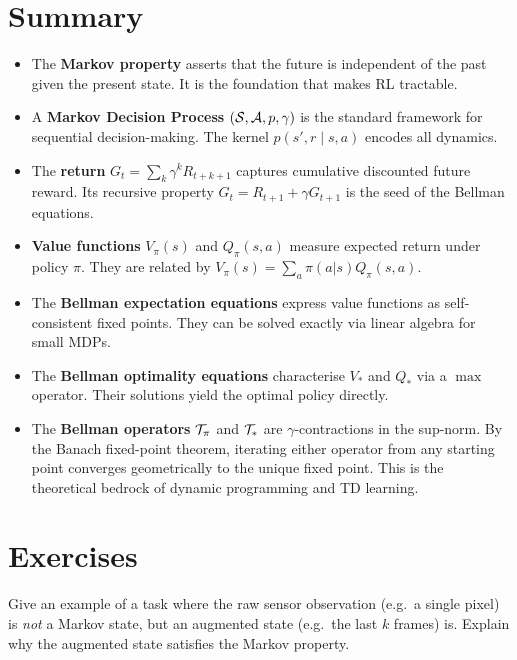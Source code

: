 \section{Summary}
\label{sec:mdp-summary}

\begin{itemize}[leftmargin=*]
  \item The \textbf{Markov property} asserts that the future is independent of the past given the present state. It is the foundation that makes RL tractable.
  \item A \textbf{Markov Decision Process} $(\mathcal{S}, \mathcal{A}, p, \gamma)$ is the standard framework for sequential decision-making. The kernel $p(s', r \mid s, a)$ encodes all dynamics.
  \item The \textbf{return} $G_t = \sum_k \gamma^k R_{t+k+1}$ captures cumulative discounted future reward. Its recursive property $G_t = R_{t+1} + \gamma G_{t+1}$ is the seed of the Bellman equations.
  \item \textbf{Value functions} $V_\pi(s)$ and $Q_\pi(s,a)$ measure expected return under policy $\pi$. They are related by $V_\pi(s) = \sum_a \pi(a|s) Q_\pi(s,a)$.
  \item The \textbf{Bellman expectation equations} express value functions as self-consistent fixed points. They can be solved exactly via linear algebra for small MDPs.
  \item The \textbf{Bellman optimality equations} characterise $V_*$ and $Q_*$ via a $\max$ operator. Their solutions yield the optimal policy directly.
  \item The \textbf{Bellman operators} $\mathcal{T}_\pi$ and $\mathcal{T}_*$ are $\gamma$-contractions in the sup-norm. By the Banach fixed-point theorem, iterating either operator from any starting point converges geometrically to the unique fixed point. This is the theoretical bedrock of dynamic programming and TD learning.
\end{itemize}


\section*{Exercises}

\begin{exercise}
\label{ex:markov-state}
Give an example of a task where the raw sensor observation (e.g.\ a single pixel) is \emph{not} a Markov state, but an augmented state (e.g.\ the last $k$ frames) is. Explain why the augmented state satisfies the Markov property.
\end{exercise}


